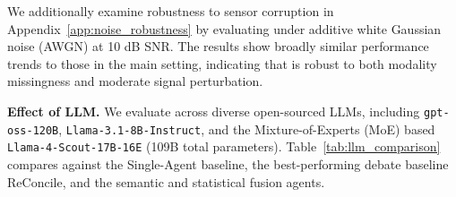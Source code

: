 We additionally examine robustness to sensor corruption in Appendix~\ref{app:noise_robustness} by evaluating \system{} under additive white Gaussian noise (AWGN) at 10 dB SNR. The results show broadly similar performance trends to those in the main setting, indicating that \system{} is robust to both modality missingness and moderate signal perturbation.


% 






\noindent \textbf{Effect of LLM.} We evaluate \system{} across diverse open-sourced LLMs, including %
\texttt{gpt-oss-120B}, \texttt{Llama-3.1-8B-Instruct}, and the Mixture-of-Experts (MoE) based \texttt{Llama-4-Scout-17B-16E} (109B total parameters). Table~\ref{tab:llm_comparison} compares \system{} against the Single-Agent baseline, the best-performing debate baseline ReConcile, and the semantic and statistical fusion agents.

